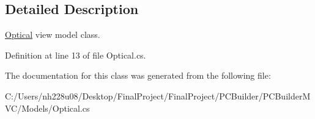 \subsection{Detailed Description}
\hyperlink{class_p_c_builder_m_v_c_1_1_models_1_1_optical}{Optical} view model class. 



Definition at line 13 of file Optical.\+cs.



The documentation for this class was generated from the following file\+:\begin{DoxyCompactItemize}
\item 
C\+:/\+Users/nh228u08/\+Desktop/\+Final\+Project/\+Final\+Project/\+P\+C\+Builder/\+P\+C\+Builder\+M\+V\+C/\+Models/Optical.\+cs\end{DoxyCompactItemize}
